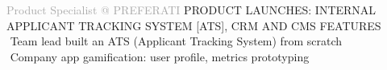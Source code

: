 \begin{cvtable}
%
% 
{\textcolor{darkgray}{%
Product Specialist \newline
@ {P\scriptsize REFERATI}
}}%
{}%
{%
    {\scriptsize PRODUCT LAUNCHES:
    INTERNAL APPLICANT TRACKING SYSTEM [ATS],
    CRM AND CMS FEATURES
    } \\
     \textperiodcentered $ $ Team lead built an ATS (Applicant Tracking System) from scratch \\
     \textperiodcentered $ $ Company app gamification: user profile, metrics prototyping \\
}
\end{cvtable}
